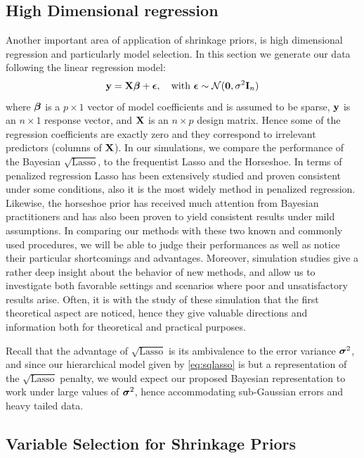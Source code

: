 \documentclass[10pt]{article}
\begin{document}
\subsection{High Dimensional regression}

Another important area of application of shrinkage priors, is high dimensional regression and particularly model selection. In this section we generate our data following the linear regression model:
$$ {\bf y}  = {\bf X}\boldsymbol{\beta} + \boldsymbol{\epsilon}, \quad \text{with } \boldsymbol{\epsilon} \sim \mathcal{N}({\bf 0} , \sigma^2 {\bf I}_n ) $$
where $\boldsymbol{\beta}$ is a $p\times 1$ vector of model coefficients and is assumed to be sparse, ${\bf y}$ is an $n\times 1$ response vector, and $\bf X$ is an $n\times p$ design matrix. Hence some of the regression coefficients are exactly zero and they correspond to irrelevant predictors (columns of ${\bf X}$). In our simulations, we compare the performance of the Bayesian $\sqrt{\text{Lasso}}$, to the frequentist Lasso and the Horseshoe. In terms of penalized regression Lasso has been extensively studied and proven consistent under some conditions, also it is the most widely method in penalized regression. Likewise, the horseshoe prior has received much attention from Bayesian practitioners and has also been  proven to yield consistent results under mild assumptions. In comparing our methods with these two known and commonly used procedures, we will be able to judge their performances as well as notice their particular shortcomings and advantages. Moreover, simulation studies give a rather deep insight about the behavior of new methods, and allow us to investigate both favorable settings and scenarios where poor and unsatisfactory results arise. Often, it is with the study of these simulation that the first theoretical aspect are noticed, hence they give valuable directions and information both for theoretical and practical purposes.

Recall that the advantage of $\sqrt{\text{Lasso}}$ is its ambivalence to the error variance $\boldsymbol{\sigma}^2$, and since our hierarchical model given by \eqref{eq:sqlasso} is but a representation of the $\sqrt{\text{Lasso}}$ penalty, we would expect our proposed Bayesian representation to work under large values of $\boldsymbol{\sigma}^2$, hence accommodating sub-Gaussian errors and heavy tailed data.

\subsection{Variable Selection for Shrinkage Priors}\label{k-means}
\end{document}
